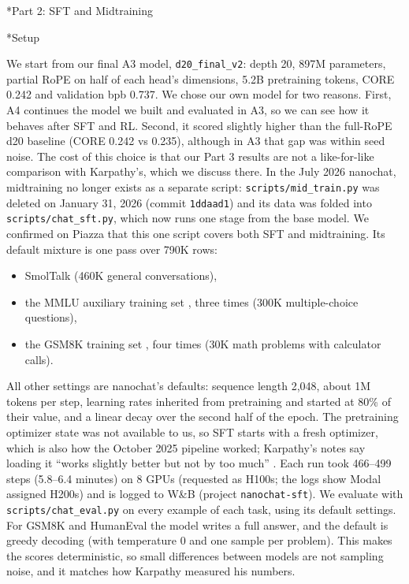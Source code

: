 \documentclass[11pt]{article}
\makeatletter
\renewcommand\section{\@startsection{section}{1}{\z@}{1.2em}{0.5em}{\large\bfseries}}
\renewcommand\subsection{\@startsection{subsection}{2}{\z@}{0.6em}{0.2em}{\normalsize\bfseries}}
\newcommand{\code}[1]{\texttt{#1}}
\makeatother
\begin{document}
\section*{Part 2: SFT and Midtraining}

\subsection*{Setup}

We start from our final A3 model, \code{d20\_final\_v2}: depth 20, 897M parameters, partial RoPE on half of each head's dimensions, 5.2B pretraining tokens, CORE 0.242 and validation bpb 0.737. We chose our own model for two reasons. First, A4 continues the model we built and evaluated in A3, so we can see how it behaves after SFT and RL. Second, it scored slightly higher than the full-RoPE d20 baseline (CORE 0.242 vs 0.235), although in A3 that gap was within seed noise. The cost of this choice is that our Part 3 results are not a like-for-like comparison with Karpathy's, which we discuss there. In the July 2026 nanochat, midtraining no longer exists as a separate script: \code{scripts/mid\_train.py} was deleted on January 31, 2026 (commit \code{1ddaad1}) and its data was folded into \code{scripts/chat\_sft.py}, which now runs one stage from the base model. We confirmed on Piazza that this one script covers both SFT and midtraining. Its default mixture is one pass over 790K rows:
\begin{itemize}[nosep]
  \item SmolTalk \cite{smoltalk} (460K general conversations),
  \item the MMLU auxiliary training set \cite{mmlu}, three times (300K multiple-choice questions),
  \item the GSM8K training set \cite{gsm8k}, four times (30K math problems with calculator calls).
\end{itemize}
All other settings are nanochat's defaults: sequence length 2,048, about 1M tokens per step, learning rates inherited from pretraining and started at 80\% of their value, and a linear decay over the second half of the epoch. The pretraining optimizer state was not available to us, so SFT starts with a fresh optimizer, which is also how the October 2025 pipeline worked; Karpathy's notes say loading it ``works slightly better but not by too much'' \cite{nanochat}. Each run took 466--499 steps (5.8--6.4 minutes) on 8 GPUs (requested as H100s; the logs show Modal assigned H200s) and is logged to W\&B (project \code{nanochat-sft}). We evaluate with \code{scripts/chat\_eval.py} on every example of each task, using its default settings. For GSM8K and HumanEval the model writes a full answer, and the default is greedy decoding (with temperature 0 and one sample per problem). This makes the scores deterministic, so small differences between models are not sampling noise, and it matches how Karpathy measured his numbers.
\end{document}
